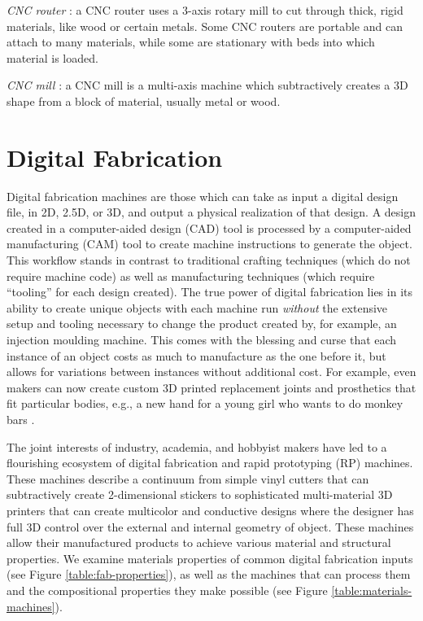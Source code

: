 \emph{CNC router} : a CNC router uses a 3-axis rotary mill to cut through thick, rigid materials, like wood or certain metals. Some CNC routers are portable and can attach to many materials, while some are stationary with beds into which material is loaded.

\emph{CNC mill} : a CNC mill is a multi-axis machine which subtractively creates a 3D shape from a block of material, usually metal or wood.

\section{Digital Fabrication}

Digital fabrication machines are those which can take as input a digital design file, in 2D, 2.5D, or 3D, and output a physical realization of that design. A design created in a computer-aided design (CAD) tool is processed by a computer-aided manufacturing (CAM) tool to create machine instructions to generate the object. This workflow stands in contrast to traditional crafting techniques (which do not require machine code) as well as manufacturing techniques (which require ``tooling'' for each design created). The true power of digital fabrication lies in its ability to create unique objects with each machine run \emph{without} the extensive setup and tooling necessary to change the product created by, for example, an injection moulding machine. This comes with the blessing and curse that each instance of an object costs as much to manufacture as the one before it, but allows for variations between instances without additional cost. For example, even makers can now create custom 3D printed replacement joints and prosthetics that fit particular bodies, e.g., a new hand for a young girl who wants to do monkey bars \cite{myers-sophie}.

The joint interests of industry, academia, and hobbyist makers have led to a flourishing ecosystem of digital fabrication and rapid prototyping (RP) machines. These machines describe a continuum from simple vinyl cutters that can subtractively create 2-dimensional stickers to sophisticated multi-material 3D printers that can create multicolor and conductive designs where the designer has full 3D control over the external and internal geometry of object. These machines allow their manufactured products to achieve various material and structural properties. We examine materials properties of common digital fabrication inputs (see Figure \ref{table:fab-properties}), as well as the machines that can process them and the compositional properties they make possible (see Figure \ref{table:materials-machines}).

